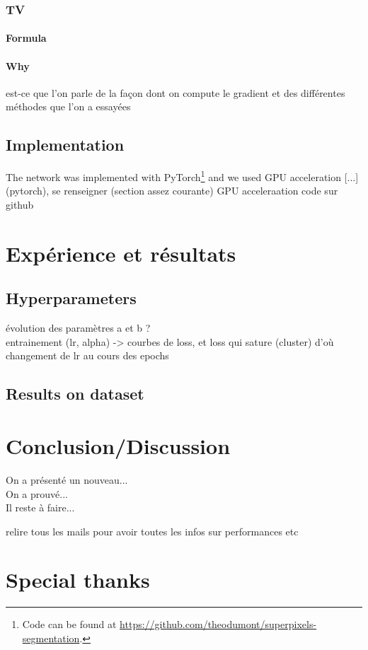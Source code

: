 \documentclass{article}
\begin{document}
\subsubsection{TV}
\paragraph{Formula}
\paragraph{Why}

est-ce que l'on parle de la façon dont on compute le gradient et des différentes méthodes que l'on a essayées

\subsection{Implementation}
The network was implemented with PyTorch\footnote{Code can be found at \url{https://github.com/theodumont/superpixels-segmentation}.} and we used GPU acceleration [...]
(pytorch), se renseigner (section assez courante)
GPU acceleraation
code sur github

\section{Expérience et résultats}
\subsection{Hyperparameters}
évolution des paramètres a et b ?\\
entrainement (lr, alpha) -> courbes de loss, et loss qui sature (cluster) d'où changement de lr au cours des epochs
\subsection{Results on dataset}


\section{Conclusion/Discussion}
On a présenté un nouveau...\\
On a prouvé...\\
Il reste à faire...

relire tous les mails pour avoir toutes les infos sur performances etc

\section*{Special thanks}
\end{document}
